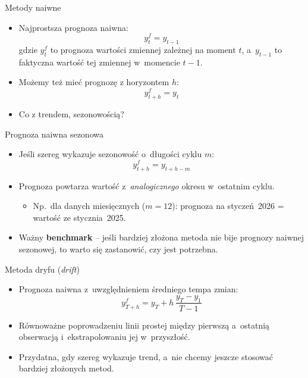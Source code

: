 \documentclass[11pt,usenames,dvipsnames,aspectratio=169]{beamer}
\begin{document}
\begin{frame}{Metody naiwne}
\begin{itemize}
    \item Najprostsza prognoza naiwna:
    \[
    y_{t}^{f}=y_{t-1}
    \]
    gdzie $y_{t}^{f}$ to prognoza wartości zmiennej zależnej na moment $t$, a~$y_{t-1}$ to faktyczna wartość tej zmiennej w~momencie $t-1$.
    \item Możemy też mieć prognozę z horyzontem $h$:
    \[
    y_{t+h}^{f}=y_{t}
    \]
    \item Co z trendem, sezonowością?
\end{itemize}
\end{frame}

\begin{frame}{Prognoza naiwna sezonowa}
\begin{itemize}
    \item Jeśli szereg wykazuje sezonowość o~długości cyklu $m$:
    \[
    y_{t+h}^{f}=y_{t+h-m}
    \]
    \item Prognoza powtarza wartość z~\emph{analogicznego} okresu w~ostatnim cyklu.
    \begin{itemize}
        \item Np.\ dla danych miesięcznych ($m=12$): prognoza na styczeń~2026 = wartość ze stycznia~2025.
    \end{itemize}
    \item Ważny \textbf{benchmark} -- jeśli bardziej złożona metoda nie bije prognozy naiwnej sezonowej, to warto się zastanowić, czy jest potrzebna.
\end{itemize}
\end{frame}

\begin{frame}{Metoda dryfu (\emph{drift})}
\begin{itemize}
    \item Prognoza naiwna z~uwzględnieniem średniego tempa zmian:
    \[
    y_{T+h}^{f}=y_{T}+h\,\frac{y_{T}-y_{1}}{T-1}
    \]
    \item Równoważne poprowadzeniu linii prostej między pierwszą a~ostatnią obserwacją i~ekstrapolowaniu jej w~przyszłość.
    \item Przydatna, gdy szereg wykazuje trend, a~nie chcemy jeszcze stosować bardziej złożonych metod.
\end{itemize}
\end{frame}
\end{document}
